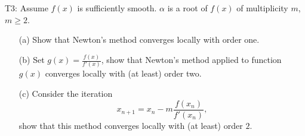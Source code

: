 \documentclass[12pt]{report}
\begin{document}
\begin{problem}
    T3: Assume $f(x)$ is sufficiently smooth. $\alpha$ is a root of $f(x)$ of multiplicity $m$, $m \geq 2$. 
    \begin{enumerate}
        \item [(a)] Show that Newton's method converges locally with order one.
        
        \item [(b)] Set $g(x) = \frac{f(x)}{f'(x)}$, show that Newton's method applied to function $g(x)$ converges locally with (at least) order two.

        \item [(c)] Consider the iteration
        \[ 
            x_{n+1} = x_n - m \frac{f(x_n)}{f'(x_n)},
        \]
        show that this method converges locally with (at least) order $2$.
    \end{enumerate}
\end{problem}
\end{document}

